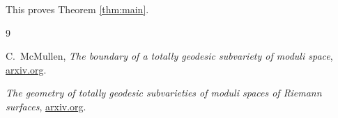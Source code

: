 \documentclass[11pt]{article}
\theoremstyle{definition}
\begin{document}
This proves Theorem \ref{thm:main}.

\begin{thebibliography}{9}

C.~McMullen, \emph{The boundary of a totally geodesic subvariety of moduli space},
\href{https://arxiv.org/html/2412.06765v1}{arxiv.org}.

\emph{The geometry of totally geodesic subvarieties of moduli spaces of Riemann surfaces},
\href{https://arxiv.org/html/2412.16330v2}{arxiv.org}.

\end{thebibliography}
\end{document}

